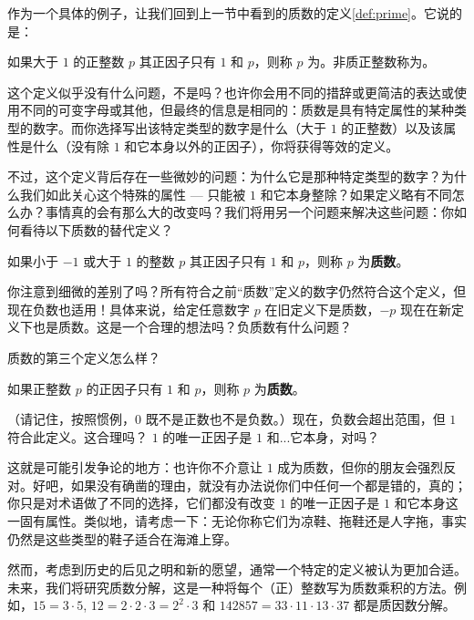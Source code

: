 作为一个具体的例子，让我们回到上一节中看到的质数的定义\ref{def:prime}。它说的是：

\begin{definition}
    如果大于 $1$ 的正整数 $p$ 其正因子只有 $1$ 和 $p$，则称 $p$ 为。非质正整数称为。
\end{definition}

这个定义似乎没有什么问题，不是吗？也许你会用不同的措辞或更简洁的表达或使用不同的可变字母或其他，但最终的信息是相同的：质数是具有特定属性的某种类型的数字。而你选择写出该特定类型的数字是什么（大于 $1$ 的正整数）以及该属性是什么（没有除 $1$ 和它本身以外的正因子），你将获得等效的定义。

不过，这个定义背后存在一些微妙的问题：为什么它是那种特定类型的数字？为什么我们如此关心这个特殊的属性 --- 只能被 $1$ 和它本身整除？如果定义略有不同怎么办？事情真的会有那么大的改变吗？我们将用另一个问题来解决这些问题：你如何看待以下质数的替代定义？

\begin{definition}\label{def:prime2}
    如果小于 $-1$ 或大于 $1$ 的整数 $p$ 其正因子只有 $1$ 和 $p$，则称 $p$ 为\textbf{质数}。
\end{definition}

你注意到细微的差别了吗？所有符合之前``质数''定义的数字仍然符合这个定义，但现在负数也适用！具体来说，给定任意数字 $p$ 在旧定义下是质数，$-p$ 现在在新定义下也是质数。这是一个合理的想法吗？负质数有什么问题？

质数的第三个定义怎么样？

\begin{definition}\label{def:prime3}
    如果正整数 $p$ 的正因子只有 $1$ 和 $p$，则称 $p$ 为\textbf{质数}。
\end{definition}

（请记住，按照惯例，$0$ 既不是正数也不是负数。）现在，负数会超出范围，但 $1$ 符合此定义。这合理吗？ $1$ 的唯一正因子是 $1$ 和...它本身，对吗？

这就是可能引发争论的地方：也许你不介意让 $1$ 成为质数，但你的朋友会强烈反对。好吧，如果没有确凿的理由，就没有办法说你们中任何一个都是错的，真的；你只是对术语做了不同的选择，它们都没有改变 $1$ 的唯一正因子是 $1$ 和它本身这一固有属性。类似地，请考虑一下：无论你称它们为凉鞋、拖鞋还是人字拖，事实仍然是这些类型的鞋子适合在海滩上穿。

然而，考虑到历史的后见之明和新的愿望，通常一个特定的定义被认为更加合适。未来，我们将研究质数分解，这是一种将每个（正）整数写为质数乘积的方法。例如，$15 = 3 \cdot 5$, $12 = 2 \cdot 2 \cdot 3 = 2^2 \cdot 3$ 和 $142857 = 33 \cdot 11 \cdot 13 \cdot 37$ 都是质因数分解。

